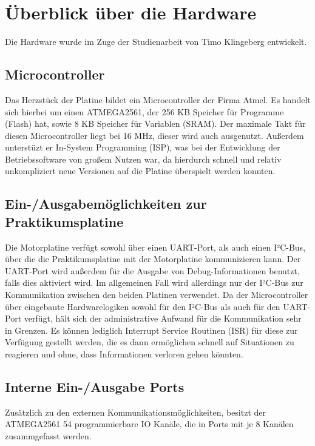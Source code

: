 \chapter{Überblick über die Hardware}

Die Hardware wurde im Zuge der Studienarbeit von Timo Klingeberg \cite{STUD_TIMO}
entwickelt.
\section{Microcontroller}
Das Herzstück der Platine bildet ein Microcontroller der Firma Atmel.
Es handelt sich hierbei um einen ATMEGA2561\cite{ATMEGA_MANUAL}, der 256 KB Speicher für
Programme (Flash) hat, sowie 8 KB Speicher für Variablen (SRAM). Der maximale Takt für
diesen Microcontroller liegt bei 16 MHz, dieser wird auch ausgenutzt. Außerdem unterstüzt
er In-System Programming (ISP), was bei der Entwicklung der Betriebssoftware von großem
Nutzen war, da hierdurch schnell und relativ unkompliziert neue Versionen auf die Platine
überspielt werden konnten.
\section{Ein-/Ausgabemöglichkeiten zur Praktikumsplatine}
Die Motorplatine verfügt sowohl über einen UART-Port, als auch einen I²C-Bus, über die
die Praktikumsplatine mit der Motorplatine kommunizieren kann. Der UART-Port wird außerdem
für die Ausgabe von Debug-Informationen benutzt, falls dies aktiviert wird. Im allgemeinen
Fall wird allerdings nur der I²C-Bus zur Kommunikation zwischen den beiden Platinen verwendet.
Da der Microcontroller über eingebaute Hardwarelogiken sowohl für den I²C-Bus als auch für
den UART-Port verfügt, hält sich der administrative Aufwand für die Kommunikation sehr in
Grenzen. Es können lediglich Interrupt Service Routinen (ISR) für diese zur Verfügung gestellt
werden, die es dann ermöglichen schnell auf Situationen zu reagieren und ohne, dass
Informationen verloren gehen könnten.
\section{Interne Ein-/Ausgabe Ports}
Zusätzlich zu den externen Kommunikationsmöglichkeiten, besitzt der ATMEGA2561 54
programmierbare IO Kanäle, die in Ports mit je 8 Kanälen zusammgefasst werden.
